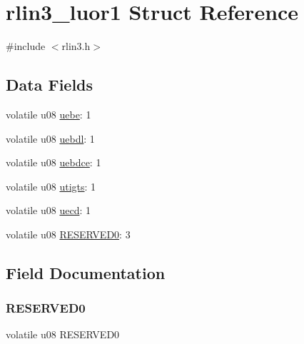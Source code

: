 \hypertarget{structrlin3__luor1}{}\section{rlin3\+\_\+luor1 Struct Reference}
\label{structrlin3__luor1}


{\ttfamily \#include $<$rlin3.\+h$>$}

\subsection*{Data Fields}
\begin{DoxyCompactItemize}
\item 
volatile u08 \mbox{\hyperlink{structrlin3__luor1_a5fbde11594cb93b55797977dc6cfa673}{uebe}}\+: 1
\item 
volatile u08 \mbox{\hyperlink{structrlin3__luor1_a8253eb29949d08d22137f36f07c2afd9}{uebdl}}\+: 1
\item 
volatile u08 \mbox{\hyperlink{structrlin3__luor1_aa571123959bc69819c6d4eb6bf4e8f2f}{uebdce}}\+: 1
\item 
volatile u08 \mbox{\hyperlink{structrlin3__luor1_a21be856b4afd08864a898101fff940f0}{utigts}}\+: 1
\item 
volatile u08 \mbox{\hyperlink{structrlin3__luor1_a5ad25a28d75171f517e116ac5426057c}{uecd}}\+: 1
\item 
volatile u08 \mbox{\hyperlink{structrlin3__luor1_a59c0b30ccfb89f1b34e9682741859abd}{R\+E\+S\+E\+R\+V\+E\+D0}}\+: 3
\end{DoxyCompactItemize}


\subsection{Field Documentation}
\mbox{\label{structrlin3__luor1_a59c0b30ccfb89f1b34e9682741859abd}} 
\subsubsection{\texorpdfstring{R\+E\+S\+E\+R\+V\+E\+D0}{RESERVED0}}
{\footnotesize\ttfamily volatile u08 R\+E\+S\+E\+R\+V\+E\+D0}

\mbox{\label{structrlin3__luor1_aa571123959bc69819c6d4eb6bf4e8f2f}} 
